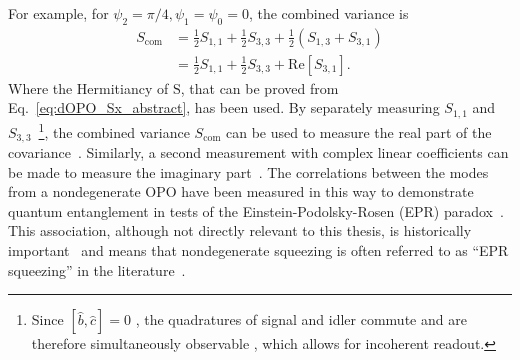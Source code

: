 For example, for $\psi_2=\pi/4,\psi_1=\psi_0=0$, the combined variance is
\begin{align}\label{eq:Scom_nOPO_eg}
S_\text{com}&=\frac{1}{2}S_{1,1}+\frac{1}{2}S_{3,3}+\frac{1}{2}(S_{1,3}+S_{3,1})\\
&=\frac{1}{2}S_{1,1}+\frac{1}{2}S_{3,3}+\text{Re}[S_{3,1}].\nonumber
\end{align} 
Where the Hermitiancy of $\text{S}$, that can be proved from Eq.~\ref{eq:dOPO_Sx_abstract}, has been used.
By separately measuring $S_{1,1}$ and $S_{3,3}$~\footnote{Since $[\hat b, \hat c]=0$ , the quadratures of signal and idler commute and are therefore simultaneously observable , which allows for incoherent readout.}, the combined variance $S_\text{com}$ can be used to measure the real part of the covariance~\cite{}. Similarly, a second measurement with complex linear coefficients can be made to measure the imaginary part~\cite{}. The correlations between the modes from a nondegenerate OPO have been measured in this way to demonstrate quantum entanglement in tests of the Einstein-Podolsky-Rosen (EPR) paradox~\cite{PhysRev.47.777,reidDemonstrationEinsteinPodolskyRosenParadox1989,schoriNarrowbandFrequencyTunable2002}. This association, although not directly relevant to this thesis, is historically important~\cite{} and means that nondegenerate squeezing is often referred to as ``EPR squeezing'' in the literature~\cite{}. %

